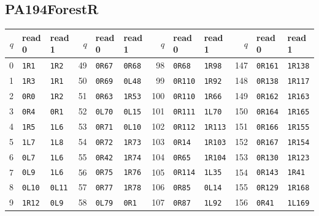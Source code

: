 \subsection{PA194ForestR}
\begin{center}\fontsize{8.5}{9.3}\selectfont
\setlength{\tabcolsep}{5pt}\renewcommand{\arraystretch}{1.03}
\begin{tabular}{rll@{\hspace{12pt}}rll@{\hspace{12pt}}rll@{\hspace{12pt}}rll}
\toprule
$q$ & read 0 & read 1 & $q$ & read 0 & read 1 & $q$ & read 0 & read 1 & $q$ & read 0 & read 1\\\midrule
0 & \texttt{1R1} & \texttt{1R2} & 49 & \texttt{0R67} & \texttt{0R68} & 98 & \texttt{0R68} & \texttt{1R98} & 147 & \texttt{0R161} & \texttt{1R138}\\
1 & \texttt{1R3} & \texttt{1R1} & 50 & \texttt{0R69} & \texttt{0L48} & 99 & \texttt{0R110} & \texttt{1R92} & 148 & \texttt{0R138} & \texttt{1R117}\\
2 & \texttt{0R0} & \texttt{1R2} & 51 & \texttt{0R63} & \texttt{1R53} & 100 & \texttt{0R110} & \texttt{1R66} & 149 & \texttt{0R162} & \texttt{1R163}\\
3 & \texttt{0R4} & \texttt{0R1} & 52 & \texttt{0L70} & \texttt{0L15} & 101 & \texttt{0R111} & \texttt{1L70} & 150 & \texttt{0R164} & \texttt{1R165}\\
4 & \texttt{1R5} & \texttt{1L6} & 53 & \texttt{0R71} & \texttt{0L10} & 102 & \texttt{0R112} & \texttt{1R113} & 151 & \texttt{0R166} & \texttt{1R155}\\
5 & \texttt{1L7} & \texttt{1L8} & 54 & \texttt{0R72} & \texttt{1R73} & 103 & \texttt{0R14} & \texttt{1R103} & 152 & \texttt{0R167} & \texttt{1R154}\\
6 & \texttt{0L7} & \texttt{1L6} & 55 & \texttt{0R42} & \texttt{1R74} & 104 & \texttt{0R65} & \texttt{1R104} & 153 & \texttt{0R130} & \texttt{1R123}\\
7 & \texttt{0L9} & \texttt{1L6} & 56 & \texttt{0R75} & \texttt{1R76} & 105 & \texttt{0R114} & \texttt{1L35} & 154 & \texttt{0R143} & \texttt{1R41}\\
8 & \texttt{0L10} & \texttt{0L11} & 57 & \texttt{0R77} & \texttt{1R78} & 106 & \texttt{0R85} & \texttt{0L14} & 155 & \texttt{0R129} & \texttt{1R168}\\
9 & \texttt{1R12} & \texttt{0L9} & 58 & \texttt{0L79} & \texttt{0R1} & 107 & \texttt{0R87} & \texttt{1L92} & 156 & \texttt{0R41} & \texttt{1L169}\\

\end{tabular}
\end{center}
